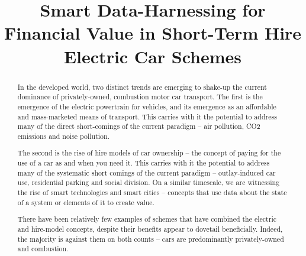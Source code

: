 \documentclass[conference]{IEEEtran}
\begin{document}
%
\title{Smart Data-Harnessing for Financial Value in Short-Term Hire Electric Car Schemes}


\author{
\and
{}
\and
{}
}





\maketitle


\begin{abstract}
In the developed world, two distinct trends are emerging to shake-up
the current dominance of privately-owned, combustion motor car
transport. The first is the emergence of the electric powertrain for
vehicles, and its emergence as an affordable and mass-marketed means
of transport. This carries with it the potential to address many of
the direct short-comings of the current paradigm -- air pollution, CO2
emissions and noise pollution.

The second is the rise of hire models of car ownership -- the concept
of paying for the use of a car as and when you need it. This carries
with it the potential to address many of the systematic short comings
of the current paradigm -- outlay-induced car use, residential parking
and social division.  On a similar timescale, we are witnessing the
rise of smart technologies and smart cities -- concepts that use data
about the state of a system or elements of it to create value.

There have been relatively few examples of schemes that have combined
the electric and hire-model concepts, despite their benefits appear to
dovetail beneficially. Indeed, the majority is against them on both
counts -- cars are predominantly privately-owned and combustion.
\end{abstract}
\end{document}
